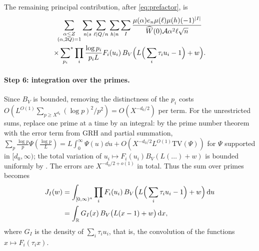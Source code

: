 \documentclass[11pt,colorlinks]{charlie}
\newcommand{\cA}{\mathcal{A}}
\begin{document}
The remaining principal contribution, after \eqref{eq:prefactor}, is
\begin{multline*}
 \sum_{\substack{\alpha\le Z\\(\alpha,2Q)=1}}\sum_{n\mid s}\sum_{\ell\mid Q/n}\sum_{h\mid n}\sum_{I}\frac{\mu(\alpha)e_n\mu(\ell)\mu(h)(-1)^{|I|}}{\widehat W(0)\cA\alpha^2\ell\sqrt n}\\
 \times\sideset{}{^*}\sum_{p_i}\prod_i\frac{\log p_i}{p_iL}F_i(u_i)\,B_V\Big(L\Big(\sum_i\tau_iu_i-1\Big)+w\Big).
\end{multline*}

\paragraph{Step 6: integration over the primes.}
Since $B_V$ is bounded, removing the distinctness of the $p_i$ costs $O(L^{O(1)}\sum_{p\ge X^{d_0}}(\log p)^2/p^2)=O(X^{-d_0/2})$ per term. For the unrestricted sums, replace one prime at a time by an integral: by the prime number theorem with the error term from GRH and partial summation, $\sum_p\frac{\log p}{p}\Psi(\frac{\log p}L)=L\int_0^\infty\Psi(u)\dd u+O(X^{-d_0/2}L^{O(1)}\mathrm{TV}(\Psi))$ for $\Psi$ supported in $[d_0,\infty)$; the total variation of $u_i\mapsto F_i(u_i)B_V(L(\dots)+w)$ is bounded uniformly by . The errors are $X^{-d_0/2+o(1)}$ in total. Thus the sum over primes becomes
\begin{align*}
 J_I(w)&=\int_{[0,\infty)^a}\prod_iF_i(u_i)\,B_V\Big(L\Big(\sum_i\tau_iu_i-1\Big)+w\Big)\,\mathrm{d} u\\
 &=\int_{\mathbb{R}} G_I(x)\,B_V\big(L(x-1)+w\big)\,\mathrm{d} x,
\end{align*}
where $G_I$ is the density of $\sum_i\tau_iu_i$, that is, the convolution of the functions $x\mapsto F_i(\tau_ix)$.
\end{document}
